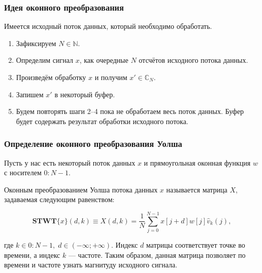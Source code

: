 \documentclass[notes=only]{beamer}
\begin{document}
\begin{frame}\frametitle{Идея оконного преобразования}
Имеется исходный поток данных, который необходимо обработать.

\begin{enumerate}
  \item Зафиксируем $N \in \mathbb{N}$.
  \item Определим сигнал $x$, как очередные $N$ отсчётов исходного потока данных. 
  \item Произведём обработку $x$ и получим $x' \in \mathbb{C}_N$.
  \item Запишем $x'$ в некоторый буфер.
  \item Будем повторять шаги 2--4 пока не обработаем весь поток данных.
    Буфер будет содержать результат обработки исходного потока.
\end{enumerate}

\end{frame}
    
  
\begin{frame}\frametitle{Определение оконного преобразования Уолша}
Пусть у нас есть
некоторый поток данных $x$ и прямоугольная оконная функция $w$ с носителем
$0:N-1$.

Оконным преобразованием Уолша потока данных $x$ называется матрица $X$, задаваемая 
следующим равенством:

\begin{equation}
\mathbf{STWT}\{x\}(d,k)\equiv X(d,k) 
= \frac{1}{N} \sum_{j=0}^{N-1} x[j+d]w[j]\hat{v}_k(j),
\end{equation}

где $k \in 0:N-1, \; d \in (-\infty; +\infty)$. 
Индекс $d$ матрицы соответствует точке во времени, а индекс $k$ --- частоте.
Таким образом, данная матрица позволяет по времени и частоте узнать 
магнитуду исходного сигнала.

\end{frame}
    
\end{document}
